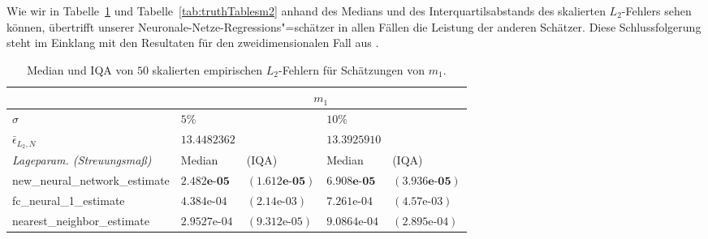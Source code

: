 
Wie wir in Tabelle~\ref{tab:truthTablesm1} und Tabelle~\ref{tab:truthTablesm2} anhand des Medians und des Interquartilsabstands des skalierten $L_2$-Fehlers sehen können, übertrifft unserer Neuronale-Netze-Regressions"=schätzer in allen Fällen die Leistung der anderen Schätzer. Diese Schlussfolgerung steht im Einklang mit den Resultaten für den zweidimensionalen Fall aus \cite[Tabel 1]{kohler19} .
\begin{table}
\centering
\begin{tabular}{ |p{5cm}||p{1.7cm} p{2cm}|p{1.7cm} p{2cm}|}
 \hline
 & \multicolumn{4}{|c|}{$m_1$}\\
 \hline
 $\sigma$& $5\%$& & $10\%$ &\\
 \hline
 $\bar{\epsilon}_{L_2,N}$& $13.4482362$ & & $13.3925910$ & \\
 \hline
 \textit{Lageparam. (Streuungsmaß) }&  Median &(IQA) &  Median &(IQA)   \\
 \hline
new\_neural\_network\_estimate & $\mathbf{2.482\textbf{e-}05}$& $\mathbf{(1.612\textbf{e-}05)}$   & $\mathbf{6.908\textbf{e-}05}$&$\mathbf{ (3.936\textbf{e-}05)}$  \\
 fc\_neural\_1\_estimate & $4.384\text{e-}04$&$(2.14\text{e-}03)$ &   $7.261\text{e-}04$&$(4.57\text{e-}03)$ \\
 nearest\_neighbor\_estimate & $2.9527\text{e-}04$&$(9.312\text{e-}05)$ & $9.0864\text{e-}04$&$(2.895\text{e-}04)$\\
 \hline
\end{tabular}
    \caption{Median und IQA von $50$ skalierten empirischen $L_2$-Fehlern für Schätzungen von $m_1$.}
     \label{tab:truthTablesm1}   
\end{table}

